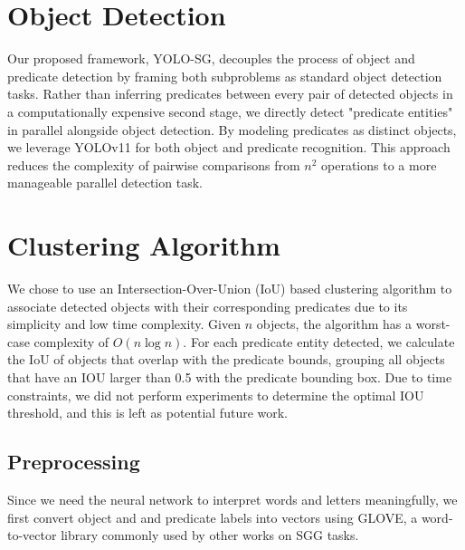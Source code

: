 \documentclass{article}
\begin{document}
\section{Object Detection}
Our proposed framework, YOLO-SG, decouples the process of object and predicate detection by framing both subproblems as standard object detection tasks. Rather than inferring predicates between every pair of detected objects in a computationally expensive second stage, we directly detect "predicate entities" in parallel alongside object detection. By modeling predicates as distinct objects, we leverage YOLOv11\cite{ultralytics11} for both object and predicate recognition. This approach reduces the complexity of pairwise comparisons from $n^2$ operations to a more manageable parallel detection task.

\section{Clustering Algorithm}
We chose to use an Intersection-Over-Union (IoU) based clustering algorithm to associate detected objects with their corresponding predicates due to its simplicity and low time complexity. Given $n$ objects, the algorithm has a worst-case complexity of $O(n \log n)$. For each predicate entity detected, we calculate the IoU of objects that overlap with the predicate bounds, grouping all objects that have an IOU larger than 0.5 with the predicate bounding box. Due to time constraints, we did not perform experiments to determine the optimal IOU threshold, and this is left as potential future work.

\subsection{Preprocessing}
Since we need the neural network to interpret words and letters meaningfully, we first convert object and and predicate labels into vectors using GLOVE\cite{pennington2014glove}, a word-to-vector library commonly used by other works on SGG tasks\cite{lee2018multi}. 
\end{document}
